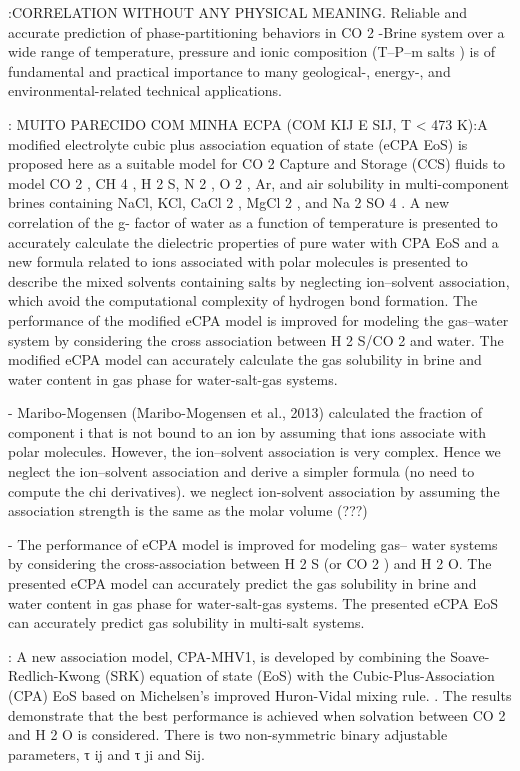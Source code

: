 \cite{Sun2021}:CORRELATION WITHOUT ANY PHYSICAL MEANING. Reliable and accurate prediction of phase-partitioning behaviors in CO 2 -Brine system over a wide range of temperature, pressure and ionic composition (T–P–m salts ) is of fundamental and practical importance to many geological-, energy-, and environmental-related technical applications.




\cite{Xiong2023}: MUITO PARECIDO COM MINHA ECPA (COM KIJ E SIJ, T < 473 K):A modified electrolyte cubic plus association equation of state (eCPA EoS) is proposed here as a suitable model for CO 2 Capture and Storage (CCS) fluids to model CO 2 , CH 4 , H 2 S, N 2 , O 2 , Ar, and air solubility in multi-component brines containing NaCl, KCl, CaCl 2 , MgCl 2 , and Na 2 SO 4 . A new correlation of the g- factor of water as a function of temperature is presented to accurately calculate the dielectric properties of pure water with CPA EoS and a new formula related to ions associated with polar molecules is presented to describe the mixed solvents containing salts by neglecting ion–solvent association, which avoid the computational complexity of hydrogen bond formation. The performance of the modified eCPA model is improved for modeling the gas–water system by considering the cross association between H 2 S/CO 2 and water. The modified eCPA model can accurately calculate the gas solubility in brine and water content in gas phase for water-salt-gas systems.

- Maribo-Mogensen (Maribo-Mogensen et al., 2013) calculated the fraction of component i that is not bound to an ion by assuming that ions associate with polar molecules. However, the ion–solvent association is very complex. Hence we neglect the ion–solvent association and derive a simpler formula (no need to compute the chi derivatives). we neglect ion-solvent association by
assuming the association strength is the same as the molar volume (???)

- The performance of eCPA model is improved for modeling gas–
water systems by considering the cross-association between
H 2 S (or CO 2 ) and H 2 O. The presented eCPA model can accurately predict the gas solubility in brine and water content in gas phase for water-salt-gas
systems. The presented eCPA EoS can accurately predict gas solubility in
multi-salt systems.



\cite{Yang2024}: A new association model, CPA-MHV1, is developed by combining the Soave-Redlich-Kwong (SRK) equation of state (EoS) with the Cubic-Plus-Association (CPA) EoS based on Michelsen’s improved Huron-Vidal mixing rule. . The results demonstrate that the best performance is achieved when solvation between CO 2 and H 2 O is considered. There is two non-symmetric binary adjustable parameters, τ ij and τ ji and Sij.

